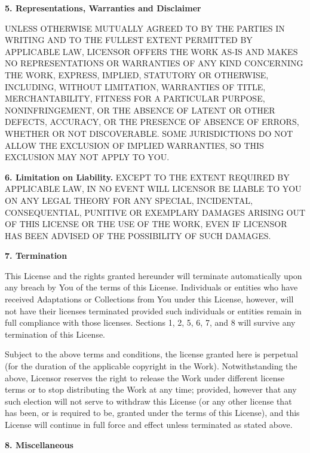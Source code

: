\par \textbf{5. Representations, Warranties and
Disclaimer}
\par UNLESS OTHERWISE MUTUALLY AGREED TO BY THE PARTIES IN
WRITING AND TO THE FULLEST EXTENT PERMITTED BY APPLICABLE
LAW, LICENSOR OFFERS THE WORK AS-IS AND MAKES NO
REPRESENTATIONS OR WARRANTIES OF ANY KIND CONCERNING THE
WORK, EXPRESS, IMPLIED, STATUTORY OR OTHERWISE, INCLUDING,
WITHOUT LIMITATION, WARRANTIES OF TITLE, MERCHANTABILITY,
FITNESS FOR A PARTICULAR PURPOSE, NONINFRINGEMENT, OR THE
ABSENCE OF LATENT OR OTHER DEFECTS, ACCURACY, OR THE
PRESENCE OF ABSENCE OF ERRORS, WHETHER OR NOT DISCOVERABLE.
SOME JURISDICTIONS DO NOT ALLOW THE EXCLUSION OF IMPLIED
WARRANTIES, SO THIS EXCLUSION MAY NOT APPLY TO YOU.
\par \textbf{6. Limitation on Liability.} EXCEPT TO
THE EXTENT REQUIRED BY APPLICABLE LAW, IN NO EVENT WILL
LICENSOR BE LIABLE TO YOU ON ANY LEGAL THEORY FOR ANY
SPECIAL, INCIDENTAL, CONSEQUENTIAL, PUNITIVE OR EXEMPLARY
DAMAGES ARISING OUT OF THIS LICENSE OR THE USE OF THE WORK,
EVEN IF LICENSOR HAS BEEN ADVISED OF THE POSSIBILITY OF
SUCH DAMAGES.
\par \textbf{7. Termination}
\begin{doclicense@enumerate}
\item This License and the rights granted hereunder will
terminate automatically upon any breach by You of the
terms of this License. Individuals or entities who have
received Adaptations or Collections from You under this
License, however, will not have their licenses terminated
provided such individuals or entities remain in full
compliance with those licenses. Sections 1, 2, 5, 6, 7,
and 8 will survive any termination of this License.
\item Subject to the above terms and conditions, the
license granted here is perpetual (for the duration of
the applicable copyright in the Work). Notwithstanding
the above, Licensor reserves the right to release the
Work under different license terms or to stop
distributing the Work at any time; provided, however that
any such election will not serve to withdraw this License
(or any other license that has been, or is required to
be, granted under the terms of this License), and this
License will continue in full force and effect unless
terminated as stated above.
\end{doclicense@enumerate}
\par \textbf{8. Miscellaneous}
